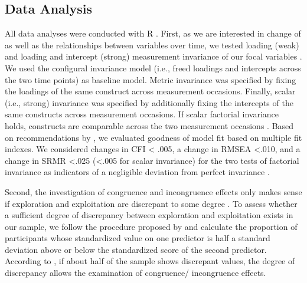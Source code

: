 \documentclass[man, 12pt, a4paper, noextraspace]{apa6}
\begin{document}
\subsection{Data Analysis}
All data analyses were conducted with R \parencite{Team2019}. 
First, as we are interested in change of as well as the relationships between variables over time, we tested loading (weak) and loading and intercept (strong) measurement invariance of our focal variables \parencite{Little.2013}. 
We used the configural invariance model (i.e., freed loadings and intercepts across the two time points) as baseline model. 
Metric invariance was specified by fixing the loadings of the same construct across measurement occasions. 
Finally, scalar (i.e., strong) invariance was specified by additionally fixing the intercepts of the same constructs across measurement occasions. 
If scalar factorial invariance holds, constructs are comparable across the two measurement occasions \parencite{Little.2013}. 
Based on recommendations by \textcite{Chen2007}, we evaluated goodness of model fit based on multiple fit indexes.  
We considered changes in CFI < .005, a change in RMSEA <.010, and a change in SRMR <.025 (<.005 for scalar invariance) for the two tests of factorial invariance as indicators of a negligible deviation from perfect invariance \textcite{Chen2007}. \par

Second, the investigation of congruence and incongruence effects only makes sense if exploration and exploitation are discrepant to some degree \parencite{Shanock.2010b}.
To assess whether a sufficient degree of discrepancy between exploration and exploitation exists in our sample, we follow the procedure proposed by \textcite{Shanock.2010b} and calculate the proportion of participants whose standardized value on one predictor is half a standard deviation above or below the standardized score of the second predictor.  
According to \textcite{Shanock.2010b}, if about half of the sample shows discrepant values, the degree of discrepancy allows the examination of congruence/ incongruence effects. \par 
\end{document}
